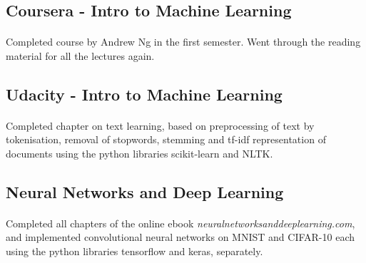 \documentclass{report}
\begin{document}
    \hspace{-6.2cm}
    \setlength{\headsep}{0pt}
    \setlength{\voffset}{-1.5inch}
    \setlength{\headheight}{0pt}
    \setlength{\topmargin}{0pt}
    \\[1cm]
    
        \subsection*{\fontsize{16}{20}\selectfont Coursera - Intro to Machine Learning}
        	\vspace{+1mm}\paragraph{}{\fontsize{13}{16}\selectfont Completed course by Andrew Ng in the first semester. Went through the reading material for all the lectures again.}\\[-2mm]
        
        \subsection*{\fontsize{16}{20}\selectfont Udacity - Intro to Machine Learning}
        	\vspace{+1mm}\paragraph{}{\fontsize{13}{16}\selectfont Completed chapter on text learning, based on preprocessing of text by tokenisation, removal of stopwords, stemming and tf-idf representation of documents using the python libraries scikit-learn and NLTK.}\\[-2mm]
        
        \subsection*{\fontsize{16}{20}\selectfont Neural Networks and Deep Learning}
        	\vspace{+1mm}\paragraph{}{\fontsize{13}{16}\selectfont Completed all chapters of the online ebook \textit{neuralnetworksanddeeplearning.com}, and implemented convolutional neural networks on MNIST and CIFAR-10 each using the python libraries tensorflow and keras, separately.}\\[-2mm]
        
\end{document}
